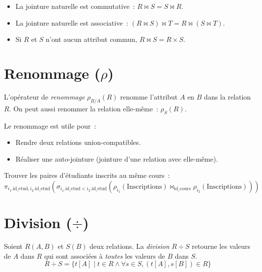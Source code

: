 \begin{proposition}
\begin{itemize}
    \item La jointure naturelle est commutative~: $R \bowtie S = S \bowtie R$.
    \item La jointure naturelle est associative~: $(R \bowtie S) \bowtie T = R \bowtie (S \bowtie T)$.
    \item Si $R$ et $S$ n'ont aucun attribut commun, $R \bowtie S = R \times S$.
\end{itemize}
\end{proposition}

\section{Renommage ($\rho$)}

\begin{definition}[Renommage]
L'op\'erateur de \emph{renommage} $\rho_{B/A}(R)$ renomme l'attribut $A$ en $B$
dans la relation $R$. On peut aussi renommer la relation elle-m\^eme~:
$\rho_S(R)$.
\end{definition}

Le renommage est utile pour~:
\begin{itemize}
    \item Rendre deux relations union-compatibles.
    \item R\'ealiser une auto-jointure (jointure d'une relation avec elle-m\^eme).
\end{itemize}

\begin{exemple}
Trouver les paires d'\'etudiants inscrits au m\^eme cours~:
\[
\pi_{i_1.\text{id\_etud}, i_2.\text{id\_etud}}(
    \sigma_{i_1.\text{id\_etud} < i_2.\text{id\_etud}}(
        \rho_{i_1}(\text{Inscriptions}) \bowtie_{\text{id\_cours}} \rho_{i_2}(\text{Inscriptions})
    )
)
\]
\end{exemple}

\section{Division ($\div$)}

\begin{definition}[Division]
Soient $R(A, B)$ et $S(B)$ deux relations. La \emph{division} $R \div S$ retourne
les valeurs de $A$ dans $R$ qui sont associ\'ees \`a \emph{toutes} les valeurs de $B$ dans $S$.
\[
R \div S = \{ t[A] \mid t \in R \land \forall s \in S, (t[A], s[B]) \in R \}
\]
\end{definition}

